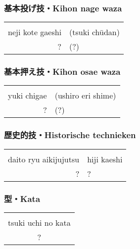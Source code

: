 \subsubsection{基本投げ技・Kihon nage waza}
\begin{table}[H]
\begin{center}
\begin{tabular}{rl}
    \ruby{}{}\ruby{}{} & \\
    neji kote gaeshi & (tsuki ch\={u}dan)\\
    ? & (?)
\end{tabular}
\end{center}
\label{kyuu_3_kihon_nage_waza}
\end{table}

\subsubsection{基本押え技・Kihon osae waza}
\begin{table}[H]
\begin{center}
\begin{tabular}{rl}
    \ruby{}{}\ruby{}{} & \\
    yuki chigae & (ushiro eri shime)\\
    ? & (?)
\end{tabular}
\end{center}
\label{kyuu_3_kihon_osae_waza}
\end{table}

\subsubsection{歴史的技・Historische technieken}
\begin{table}[H]
\begin{center}
\begin{tabular}{rl}
    \ruby{}{}\ruby{}{} & \\
    daito ryu aikijujutsu & hiji kaeshi\\
    ? & ?
\end{tabular}
\end{center}
\label{kyuu_3_historic}
\end{table}

\subsubsection{型・Kata}
\begin{table}[H]
\begin{center}
\begin{tabular}{c}
    \ruby{}{}\ruby{}{}\\
    tsuki uchi no kata\\
    ?
\end{tabular}
\end{center}
\label{kyuu_3_kata}
\end{table}

